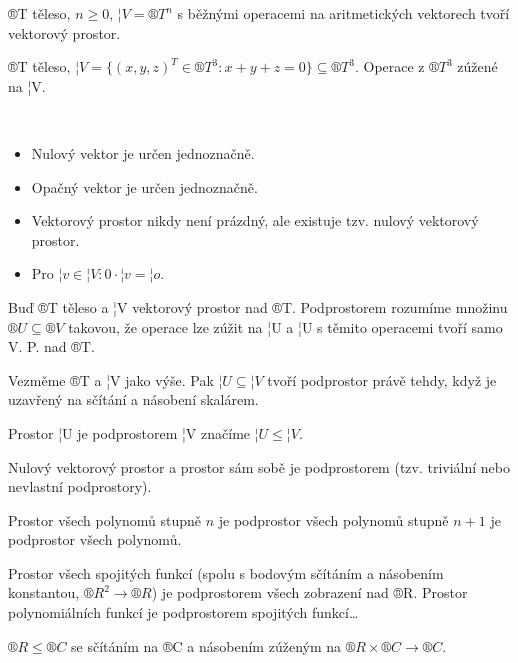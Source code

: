 \documentclass[12pt]{article}					%
\begin{document}
        \begin{priklady}
            ®T těleso, $n≥0$, $¦V = ®T^n$ s běžnými operacemi na aritmetických vektorech tvoří vektorový prostor.

            ®T těleso, $¦V = \{(x, y, z)^T \in ®T^3: x+y+z = 0\} \subseteq ®T^3$. Operace z $®T^3$ zúžené na ¦V.
        \end{priklady}

        \begin{tvrzeni}
            \ 
            \begin{itemize}
                \item Nulový vektor je určen jednoznačně.
                \item Opačný vektor je určen jednoznačně.
                \item Vektorový prostor nikdy není prázdný, ale existuje tzv. nulový vektorový prostor.
                \item Pro $¦v \in ¦V: 0·¦v = ¦o$.
            \end{itemize}
        \end{tvrzeni}

        \begin{definice}
            Buď ®T těleso a ¦V vektorový prostor nad ®T. Podprostorem rozumíme množinu $®U \subseteq ®V$ takovou, že operace lze zúžit na ¦U a ¦U s těmito operacemi tvoří samo V. P. nad ®T.
        \end{definice}

        \begin{tvrzeni}[T5.12]
            Vezměme ®T a ¦V jako výše. Pak $¦U \subseteq ¦V$ tvoří podprostor právě tehdy, když je uzavřený na sčítání a násobení skalárem.
        \end{tvrzeni}

        \begin{poznamka}
            Prostor ¦U je podprostorem ¦V značíme $¦U ≤ ¦V$.

            Nulový vektorový prostor a prostor sám sobě je podprostorem (tzv. triviální nebo nevlastní podprostory).
        \end{poznamka}


        \begin{priklady}
            Prostor všech polynomů stupně $n$ je podprostor všech polynomů stupně $n+1$ je podprostor všech polynomů.

            Prostor všech spojitých funkcí (spolu s bodovým sčítáním a násobením konstantou, $®R^2 \rightarrow ®R$) je podprostorem všech zobrazení nad ®R. Prostor polynomiálních funkcí je podprostorem spojitých funkcí…

            $®R ≤ ®C$ se sčítáním na ®C a násobením zúženým na $®R\times ®C \rightarrow ®C$.
        \end{priklady}
\end{document}
